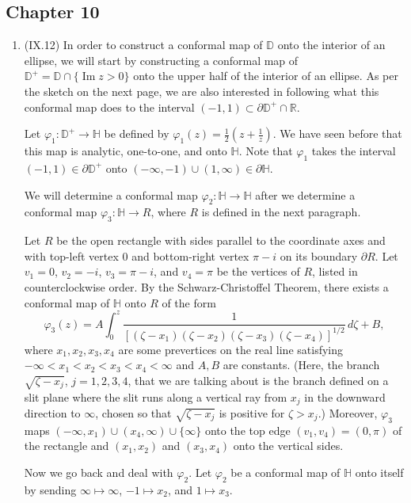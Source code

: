 \documentclass[11pt]{book}
\theoremstyle{definition}
\renewcommand{\Im}{\operatorname{Im}}
\begin{document}
\subsection{Chapter 10}
\begin{enumerate}
  \item (IX.12) In order to construct a conformal map of $\mathbb D$ onto the interior of an ellipse, we will start by constructing a conformal map of $\mathbb D^+ = \mathbb D \cap \{ \Im z > 0 \}$ onto the upper half of the interior of an ellipse.  As per the sketch on the next page, we are also interested in following what this conformal map does to the interval $(-1,1) \subset \partial \mathbb D^+ \cap \mathbb R$. 

    Let $\varphi_1 : \mathbb D^+ \to \mathbb H$ be defined by $\varphi_1(z) = \frac{1}{2} \left( z + \frac{1}{z} \right)$.  We have seen before that this map is analytic, one-to-one, and onto $\mathbb H$.  Note that $\varphi_1$ takes the interval $(-1,1) \in \partial \mathbb D^+$ onto $(-\infty, -1) \cup (1, \infty) \in \partial \mathbb H$. 

    We will determine a conformal map $\varphi_2 : \mathbb H \to \mathbb H$ after we determine a conformal map $\varphi_3 : \mathbb H \to R$, where $R$ is defined in the next paragraph.

    Let $R$ be the open rectangle with sides parallel to the coordinate axes and with top-left vertex $0$ and bottom-right vertex $\pi-i$ on its boundary $\partial R$.  Let $v_1 = 0$, $v_2 = -i$, $v_3 = \pi - i$, and $v_4 = \pi$ be the vertices of $R$, listed in counterclockwise order. By the Schwarz-Christoffel Theorem, there exists a conformal map of $\mathbb H$ onto $R$ of the form
    \[ \varphi_3(z) = A \int_0^z \frac{1}{[(\zeta-x_1) (\zeta-x_2) (\zeta-x_3) (\zeta-x_4)]^{1/2}} \, d\zeta + B , \] where $x_1, x_2, x_3, x_4$ are some prevertices on the real line satisfying $ -\infty < x_1< x_2 < x_3 < x_4 < \infty$ and $A,B$ are constants.  (Here, the branch $\sqrt{\zeta - x_j}$, $j=1,2,3,4$, that we are talking about is the branch defined on a slit plane where the slit runs along a vertical ray from $x_j$ in the downward direction to $\infty$, chosen so that $\sqrt{\zeta - x_j}$ is positive for $\zeta  > x_j$.)   Moreover, $\varphi_3$ maps $(-\infty, x_1) \cup (x_4, \infty) \cup \{ \infty \}$ onto the top edge $(v_1, v_4) = (0, \pi)$ of the rectangle and $(x_1,x_2)$ and $(x_3, x_4)$ onto the vertical sides. 

    Now we go back and deal with $\varphi_2$.  Let $\varphi_2$ be a conformal map of $\mathbb H$ onto itself by sending $\infty \mapsto \infty$, $-1 \mapsto x_2$, and $1 \mapsto x_3$. 


\end{enumerate}
\end{document}
